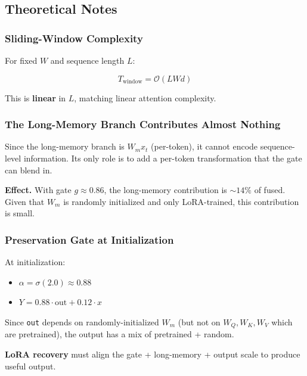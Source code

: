 \subsection{Theoretical Notes}

\subsubsection{Sliding-Window Complexity}

For fixed $W$ and sequence length $L$:

\[
T_\text{window} = \mathcal{O}(L W d)
\tag{4.12}
\]

This is \textbf{linear} in $L$, matching linear attention complexity.

\subsubsection{The Long-Memory Branch Contributes Almost Nothing}

Since the long-memory branch is $W_m x_t$ (per-token), it cannot encode 
sequence-level information. Its only role is to add a per-token 
transformation that the gate can blend in.

\textbf{Effect.} With gate $g \approx 0.86$, the long-memory contribution is 
$\sim 14\%$ of fused. Given that $W_m$ is randomly initialized and only 
LoRA-trained, this contribution is small.

\subsubsection{Preservation Gate at Initialization}

At initialization:
\begin{itemize}
\item $\alpha = \sigma(2.0) \approx 0.88$
\item $Y = 0.88 \cdot \text{out} + 0.12 \cdot x$

\end{itemize}
Since \texttt{out} depends on randomly-initialized $W_m$ (but not on $W_Q, W_K, W_V$ 
which are pretrained), the output has a mix of pretrained + random.

\textbf{LoRA recovery} must align the gate + long-memory + output scale to 
produce useful output.

